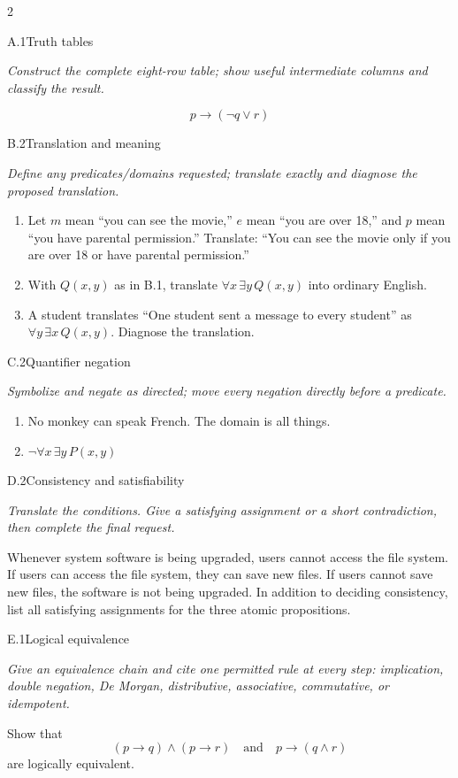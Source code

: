 \documentclass[9pt]{extarticle}
\begin{document}
\CoreWorkArea
\FormBreak
{}
\begin{multicols}{2}
\begin{CoreProblem}{A.1}{Truth tables}
{\scriptsize\textit{Construct the complete eight-row table; show useful intermediate columns and classify the result.}\par}
\[
  p\to(\neg q\lor r)
\]
\end{CoreProblem}
\begin{CoreProblem}{B.2}{Translation and meaning}
{\scriptsize\textit{Define any predicates/domains requested; translate exactly and diagnose the proposed translation.}\par}
\begin{enumerate}[label=(\alph*)]
  \item Let $m$ mean ``you can see the movie,'' $e$ mean ``you are over 18,''
        and $p$ mean ``you have parental permission.'' Translate: ``You can
        see the movie only if you are over 18 or have parental permission.''
  \item With $Q(x,y)$ as in B.1, translate $\forall x\,\exists y\,Q(x,y)$
        into ordinary English.
  \item A student translates ``One student sent a message to every student''
        as $\forall y\,\exists x\,Q(x,y)$. Diagnose the translation.
\end{enumerate}
\end{CoreProblem}
\begin{CoreProblem}{C.2}{Quantifier negation}
{\scriptsize\textit{Symbolize and negate as directed; move every negation directly before a predicate.}\par}
\begin{enumerate}[label=(\alph*)]
  \item No monkey can speak French. The domain is all things.
  \item $\neg\forall x\,\exists y\,P(x,y)$
\end{enumerate}
\end{CoreProblem}
\columnbreak
\begin{CoreProblem}{D.2}{Consistency and satisfiability}
{\scriptsize\textit{Translate the conditions. Give a satisfying assignment or a short contradiction, then complete the final request.}\par}
Whenever system software is being upgraded, users cannot access the file
system. If users can access the file system, they can save new files. If users
cannot save new files, the software is not being upgraded. In addition to
deciding consistency, list all satisfying assignments for the three atomic
propositions.
\end{CoreProblem}
\begin{CoreProblem}{E.1}{Logical equivalence}
{\scriptsize\textit{Give an equivalence chain and cite one permitted rule at every step: implication, double negation, De Morgan, distributive, associative, commutative, or idempotent.}\par}
Show that
\[
  (p\to q)\land(p\to r)
  \quad\text{and}\quad
  p\to(q\land r)
\]
are logically equivalent.
\end{CoreProblem}
\end{multicols}
\end{document}
